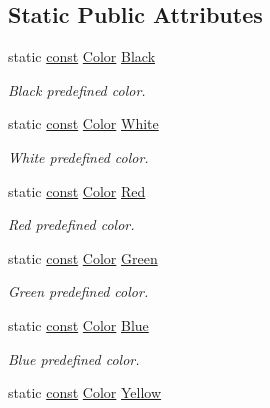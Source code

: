 \subsection*{Static Public Attributes}
\begin{DoxyCompactItemize}
\item 
static \hyperlink{term__entry_8h_a57bd63ce7f9a353488880e3de6692d5a}{const} \hyperlink{classsf_1_1_color}{Color} \hyperlink{classsf_1_1_color_a25bf5208c8c7668f1a3836acbbb23986}{Black}
\begin{DoxyCompactList}\small\item\em Black predefined color. \end{DoxyCompactList}\item 
static \hyperlink{term__entry_8h_a57bd63ce7f9a353488880e3de6692d5a}{const} \hyperlink{classsf_1_1_color}{Color} \hyperlink{classsf_1_1_color_abd9695b00da63b890ea40f74629237c0}{White}
\begin{DoxyCompactList}\small\item\em White predefined color. \end{DoxyCompactList}\item 
static \hyperlink{term__entry_8h_a57bd63ce7f9a353488880e3de6692d5a}{const} \hyperlink{classsf_1_1_color}{Color} \hyperlink{classsf_1_1_color_a7052b1c5408a953e25f9691e0e828c9d}{Red}
\begin{DoxyCompactList}\small\item\em Red predefined color. \end{DoxyCompactList}\item 
static \hyperlink{term__entry_8h_a57bd63ce7f9a353488880e3de6692d5a}{const} \hyperlink{classsf_1_1_color}{Color} \hyperlink{classsf_1_1_color_a71bdec1f240038ee66fc8f3b418fce71}{Green}
\begin{DoxyCompactList}\small\item\em Green predefined color. \end{DoxyCompactList}\item 
static \hyperlink{term__entry_8h_a57bd63ce7f9a353488880e3de6692d5a}{const} \hyperlink{classsf_1_1_color}{Color} \hyperlink{classsf_1_1_color_a6d901f24edce210decaeac1ccfdb28a9}{Blue}
\begin{DoxyCompactList}\small\item\em Blue predefined color. \end{DoxyCompactList}\item 
static \hyperlink{term__entry_8h_a57bd63ce7f9a353488880e3de6692d5a}{const} \hyperlink{classsf_1_1_color}{Color} \hyperlink{classsf_1_1_color_ad2e5e0bad294384b8cf26a92d8d8d162}{Yellow}

\end{DoxyCompactItemize}
